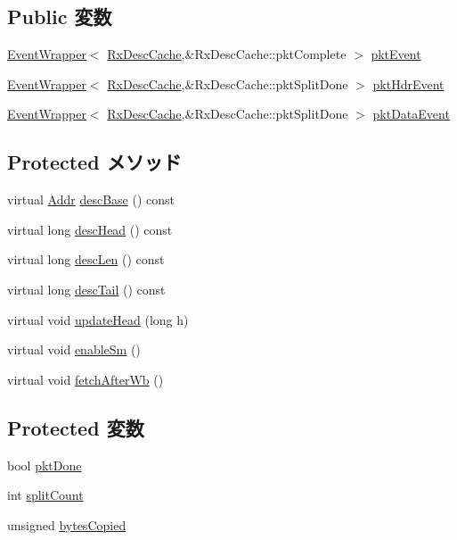 \subsection*{Public 変数}
\begin{DoxyCompactItemize}
\item 
\hyperlink{classEventWrapper}{EventWrapper}$<$ \hyperlink{classIGbE_1_1RxDescCache}{RxDescCache},\&RxDescCache::pktComplete $>$ \hyperlink{classIGbE_1_1RxDescCache_a28964c300d774b0dc1d7cabcff1cdc7b}{pktEvent}
\item 
\hyperlink{classEventWrapper}{EventWrapper}$<$ \hyperlink{classIGbE_1_1RxDescCache}{RxDescCache},\&RxDescCache::pktSplitDone $>$ \hyperlink{classIGbE_1_1RxDescCache_aa1e4265fed174c3f3f46281e329a45de}{pktHdrEvent}
\item 
\hyperlink{classEventWrapper}{EventWrapper}$<$ \hyperlink{classIGbE_1_1RxDescCache}{RxDescCache},\&RxDescCache::pktSplitDone $>$ \hyperlink{classIGbE_1_1RxDescCache_a80533f1573c797ab5f5333d376e899c7}{pktDataEvent}
\end{DoxyCompactItemize}
\subsection*{Protected メソッド}
\begin{DoxyCompactItemize}
\item 
virtual \hyperlink{base_2types_8hh_af1bb03d6a4ee096394a6749f0a169232}{Addr} \hyperlink{classIGbE_1_1RxDescCache_ae5a77c90557026fdf4fd78883f92bef9}{descBase} () const 
\item 
virtual long \hyperlink{classIGbE_1_1RxDescCache_af3d1877b6f30bdf98b95351c38d400f3}{descHead} () const 
\item 
virtual long \hyperlink{classIGbE_1_1RxDescCache_a465e4e31be3a89db3d7f9cd1ecc40064}{descLen} () const 
\item 
virtual long \hyperlink{classIGbE_1_1RxDescCache_a4b6b769be62592fc43518ba480bbd1f7}{descTail} () const 
\item 
virtual void \hyperlink{classIGbE_1_1RxDescCache_a4f8dbb4f64167626cac110753708c55c}{updateHead} (long h)
\item 
virtual void \hyperlink{classIGbE_1_1RxDescCache_aec7fdcc540223076999e0f8f07f854bc}{enableSm} ()
\item 
virtual void \hyperlink{classIGbE_1_1RxDescCache_abb8070fbcfa38a9697d92bbc4a0b6505}{fetchAfterWb} ()
\end{DoxyCompactItemize}
\subsection*{Protected 変数}
\begin{DoxyCompactItemize}
\item 
bool \hyperlink{classIGbE_1_1RxDescCache_a0807bda2e863c4492ab0165135bf396c}{pktDone}
\item 
int \hyperlink{classIGbE_1_1RxDescCache_acdf18a76e0bed7bae532a2708fc559da}{splitCount}
\item 
unsigned \hyperlink{classIGbE_1_1RxDescCache_ac3c1fb8dcc0c6c83f6a85ef03c5047db}{bytesCopied}
\end{DoxyCompactItemize}


